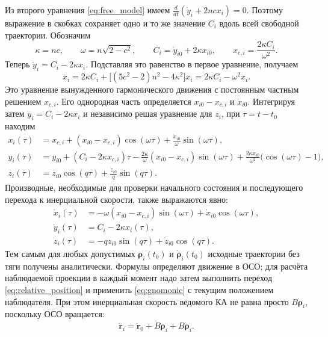 \documentclass[a4paper,12pt]{article}
\begin{document}
Из второго уравнения \eqref{eq:free_model} имеем $\frac{d}{dt}(\dot y_i+2nc x_i)=0$. Поэтому выражение в скобках сохраняет одно и то же значение $C_i$ вдоль всей свободной траектории. Обозначим
\begin{equation}
    \kappa=nc,\qquad
    \omega=n\sqrt{2-c^2},\qquad
    C_i=\dot y_{i0}+2\kappa x_{i0},\qquad
    x_{c,i}=\frac{2\kappa C_i}{\omega^2}.
    \label{eq:motion_constants}
\end{equation}
Теперь $\dot y_i=C_i-2\kappa x_i$. Подставляя это равенство в первое уравнение, получаем
\begin{equation}
    \ddot x_i=2\kappa C_i+
    \bigl[(5c^2-2)n^2-4\kappa^2\bigr]x_i
    =2\kappa C_i-\omega^2x_i.
    \label{eq:x_oscillator}
\end{equation}
Это уравнение вынужденного гармонического движения с постоянным частным решением $x_{c,i}$. Его однородная часть определяется $x_{i0}-x_{c,i}$ и $\dot x_{i0}$. Интегрируя затем $\dot y_i=C_i-2\kappa x_i$ и независимо решая уравнение для $z_i$, при $\tau=t-t_0$ находим
\begin{align}
    x_i(\tau)&=x_{c,i}+(x_{i0}-x_{c,i})\cos(\omega\tau)
                      +\frac{\dot x_{i0}}{\omega}\sin(\omega\tau),\label{eq:free_x}\\
    y_i(\tau)&=y_{i0}+(C_i-2\kappa x_{c,i})\tau
        -\frac{2\kappa}{\omega}(x_{i0}-x_{c,i})\sin(\omega\tau)
        +\frac{2\kappa\dot x_{i0}}{\omega^2}
          \bigl(\cos(\omega\tau)-1\bigr),\label{eq:free_y}\\
    z_i(\tau)&=z_{i0}\cos(q\tau)
                    +\frac{\dot z_{i0}}{q}\sin(q\tau).\label{eq:free_z}
\end{align}
Производные, необходимые для проверки начального состояния и последующего перехода к инерциальной скорости, также выражаются явно:
\begin{equation}
    \begin{aligned}
        \dot x_i(\tau)&=-\omega(x_{i0}-x_{c,i})\sin(\omega\tau)
                                      +\dot x_{i0}\cos(\omega\tau),\\
        \dot y_i(\tau)&=C_i-2\kappa x_i(\tau),\\
        \dot z_i(\tau)&=-qz_{i0}\sin(q\tau)+\dot z_{i0}\cos(q\tau).
    \end{aligned}
    \label{eq:free_velocities}
\end{equation}
Тем самым для любых допустимых $\boldsymbol\rho_i(t_0)$ и $\dot{\boldsymbol\rho}_i(t_0)$ исходные траектории без тяги получены аналитически. Формулы определяют движение в ОСО; для расчёта наблюдаемой проекции в каждый момент надо затем выполнить переход \eqref{eq:relative_position} и применить \eqref{eq:gnomonic} с текущим положением наблюдателя.
При этом инерциальная скорость ведомого КА не равна просто $B\dot{\boldsymbol\rho}_i$, поскольку ОСО вращается:
\begin{equation}
    \dot{\mathbf r}_i=\dot{\mathbf r}_0
                   +\dot B\boldsymbol\rho_i+B\dot{\boldsymbol\rho}_i.
    \label{eq:inertial_velocity_from_relative}
\end{equation}
\end{document}
